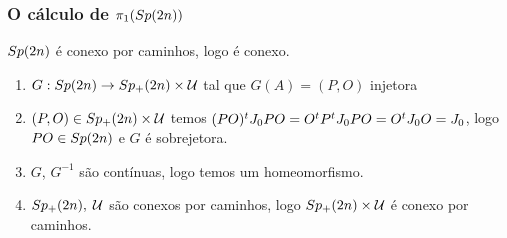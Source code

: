 \documentclass{beamer}
\begin{document}
	\begin{frame}
		\frametitle{O cálculo de $\pi_{1}(Sp(2n))$}
		\begin{teorema}\label{teoerma_sp2n_conexo}
			$Sp(2n)$ é conexo por caminhos, logo é conexo.
		\end{teorema}
		
		\begin{prova}
			\begin{enumerate}
				\item $G: Sp(2n) \to Sp_{+}(2n) \times \mathcal{U}$ tal que $G(A) = (P,O)$ injetora
				
				\pause
				\item $(P,O) \in Sp_{+}(2n) \times \mathcal{U}$ temos $(PO)^{t}J_{0} PO = O^{t}P^{t}J_{0} PO = O^{t}J_{0} O = J_{0}$, logo $PO \in Sp(2n)$ e $G$ é sobrejetora.
				
				\pause
				\item $G$, $G^{-1}$ são contínuas, logo temos um homeomorfismo.
				
				\pause
				\item $Sp_{+}(2n), \;\mathcal{U}$ são conexos por caminhos, logo $Sp_{+}(2n) \times \mathcal{U}$ é conexo por caminhos.
			\end{enumerate}
		\end{prova}
	\end{frame}
	
\end{document}
